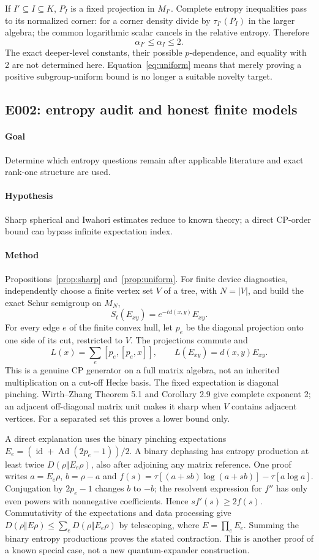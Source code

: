 \documentclass[11pt]{article}
\theoremstyle{remark}\newtheorem{remark}[definition]{Remark}
\newcommand{\id}{\operatorname{id}}
\begin{document}
If $I'\subseteq I\subseteq K$, $P_I$ is a fixed projection in $M_{I'}$.
Complete entropy inequalities pass to its normalized corner: for a
corner density divide by $\tau_{I'}(P_I)$ in the larger algebra; the
common logarithmic scalar cancels in the relative entropy. Therefore
\[
 \alpha_{I'}\leq\alpha_I\leq2.
\]
The exact deeper-level constants, their possible $p$-dependence, and
equality with 2 are not determined here. Equation~\eqref{eq:uniform}
means that merely proving a positive subgroup-uniform bound is no longer
a suitable novelty target.

\subsection{E002: entropy audit and honest finite models}
\paragraph{Goal} Determine which entropy questions remain after applicable
literature and exact rank-one structure are used.
\paragraph{Hypothesis} Sharp spherical and Iwahori estimates reduce to
known theory; a direct CP-order bound can bypass infinite expectation index.
\paragraph{Method} Propositions~\ref{prop:sharp} and~\ref{prop:uniform}.
For finite device diagnostics, independently choose a finite vertex set $V$
of a tree, with $N=|V|$, and build the exact Schur semigroup on $M_N$,
\[
 S_t(E_{xy})=e^{-td(x,y)}E_{xy}.
\]
For every edge $e$ of the finite convex hull, let $p_e$ be the diagonal
projection onto one side of its cut, restricted to $V$. The projections
commute and
\[
 L(x)=\sum_e[p_e,[p_e,x]],\qquad L(E_{xy})=d(x,y)E_{xy}.
\]
This is a genuine CP generator on a full matrix algebra, not an inherited
multiplication on a cut-off Hecke basis. The fixed expectation is diagonal
pinching. Wirth--Zhang Theorem 5.1 and Corollary 2.9 give complete exponent
2; an adjacent off-diagonal matrix unit makes it sharp when $V$ contains
adjacent vertices. For a separated set this proves a lower bound only.

A direct explanation uses the binary pinching expectations
$E_e=(\id+\operatorname{Ad}(2p_e-1))/2$. A binary dephasing has entropy
production at least twice $D(\rho\Vert E_e\rho)$, also after adjoining
any matrix reference. One proof writes $a=E_e\rho$, $b=\rho-a$ and
$f(s)=\tau[(a+sb)\log(a+sb)]-\tau[a\log a]$. Conjugation by $2p_e-1$
changes $b$ to $-b$; the resolvent expression for $f''$ has only even
powers with nonnegative coefficients. Hence $sf'(s)\geq2f(s)$.
Commutativity of the expectations and data processing give
$D(\rho\Vert E\rho)\leq\sum_eD(\rho\Vert E_e\rho)$ by telescoping,
where $E=\prod_eE_e$. Summing the binary entropy productions proves the
stated contraction. This is another proof of a known special case, not a
new quantum-expander construction.
\end{document}
